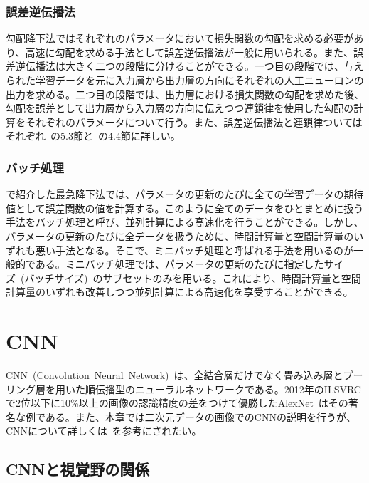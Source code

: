 \subsubsection{誤差逆伝播法}

勾配降下法ではそれぞれのパラメータにおいて損失関数の勾配を求める必要があり、高速に勾配を求める手法として誤差逆伝播法が一般に用いられる。また、誤差逆伝播法は大きく二つの段階に分けることができる。一つ目の段階では、与えられた学習データを元に入力層から出力層の方向にそれぞれの人工ニューロンの出力を求める。二つ目の段階では、出力層における損失関数の勾配を求めた後、勾配を誤差として出力層から入力層の方向に伝えつつ連鎖律を使用した勾配の計算をそれぞれのパラメータについて行う。また、誤差逆伝播法と連鎖律ついてはそれぞれ~\cite{Bishop}の5.3節と~\cite{Calculus}の4.4節に詳しい。

\subsubsection{バッチ処理}

で紹介した最急降下法では、パラメータの更新のたびに全ての学習データの期待値として誤差関数の値を計算する。このように全てのデータをひとまとめに扱う手法をバッチ処理と呼び、並列計算による高速化を行うことができる。しかし、パラメータの更新のたびに全データを扱うために、時間計算量と空間計算量のいずれも悪い手法となる。そこで、ミニバッチ処理と呼ばれる手法を用いるのが一般的である。ミニバッチ処理では、パラメータの更新のたびに指定したサイズ~(バッチサイズ)~のサブセットのみを用いる。これにより、時間計算量と空間計算量のいずれも改善しつつ並列計算による高速化を享受することができる。

\clearpage

\section{CNN}

CNN~(Convolution~Neural~Network)~は、全結合層だけでなく畳み込み層とプーリング層を用いた順伝播型のニューラルネットワークである。2012年のILSVRCで2位以下に10\%以上の画像の認識精度の差をつけて優勝したAlexNet~\cite{AlexNet}はその著名な例である。また、本章では二次元データの画像でのCNNの説明を行うが、CNNについて詳しくは~\cite{CNN_recent}を参考にされたい。

\subsection{CNNと視覚野の関係}


